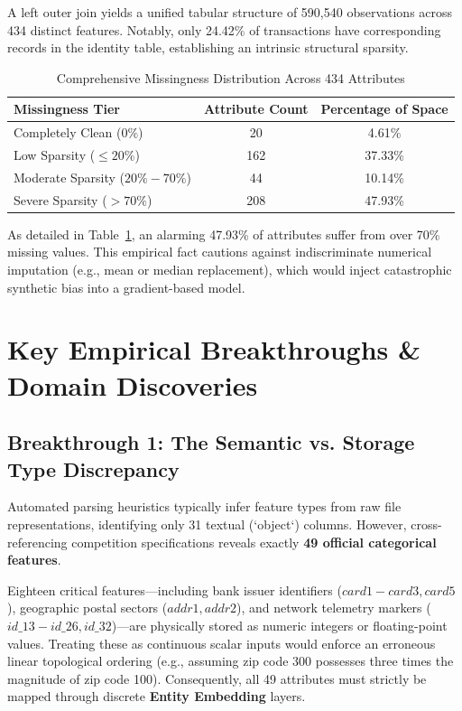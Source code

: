\documentclass[conference]{IEEEtran}
\begin{document}
A left outer join yields a unified tabular structure of 590,540 observations across 434 distinct features. Notably, only 24.42\% of transactions have corresponding records in the identity table, establishing an intrinsic structural sparsity.

\begin{table}[htbp]
\caption{Comprehensive Missingness Distribution Across 434 Attributes}
\label{tab:missingness}
\centering
\begin{tabular}{lcc}
\toprule
\textbf{Missingness Tier} & \textbf{Attribute Count} & \textbf{Percentage of Space} \\
\midrule
Completely Clean ($0\%$) & 20 & 4.61\% \\
Low Sparsity ($\le 20\%$) & 162 & 37.33\% \\
Moderate Sparsity ($20\%-70\%$) & 44 & 10.14\% \\
Severe Sparsity ($> 70\%$) & 208 & 47.93\% \\
\bottomrule
\end{tabular}
\end{table}

As detailed in Table~\ref{tab:missingness}, an alarming 47.93\% of attributes suffer from over 70\% missing values. This empirical fact cautions against indiscriminate numerical imputation (e.g., mean or median replacement), which would inject catastrophic synthetic bias into a gradient-based model.

\section{Key Empirical Breakthroughs \& Domain Discoveries}

\subsection{Breakthrough 1: The Semantic vs. Storage Type Discrepancy}
Automated parsing heuristics typically infer feature types from raw file representations, identifying only 31 textual (`object`) columns. However, cross-referencing competition specifications reveals exactly \textbf{49 official categorical features}. 

Eighteen critical features---including bank issuer identifiers ($card1-card3, card5$), geographic postal sectors ($addr1, addr2$), and network telemetry markers ($id\_13-id\_26, id\_32$)---are physically stored as numeric integers or floating-point values. Treating these as continuous scalar inputs would enforce an erroneous linear topological ordering (e.g., assuming zip code 300 possesses three times the magnitude of zip code 100). Consequently, all 49 attributes must strictly be mapped through discrete \textbf{Entity Embedding} layers.
\end{document}
